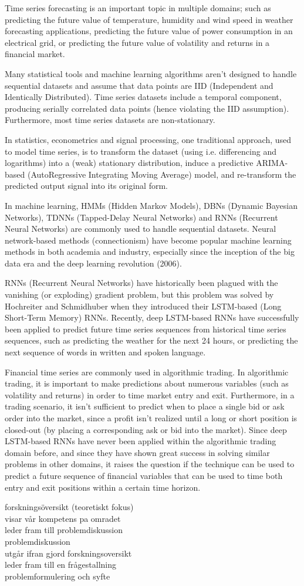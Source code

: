 
Time series forecasting is an important topic in multiple domains; such as predicting the future value of temperature, humidity and wind speed in weather forecasting applications, predicting the future value of power consumption in an electrical grid, or predicting the future value of volatility and returns in a financial market.

Many statistical tools and machine learning algorithms aren’t designed to handle sequential datasets and assume that data points are IID (Independent and Identically Distributed). Time series datasets include a temporal component, producing serially correlated data points (hence violating the IID assumption). Furthermore, most time series datasets are non-stationary.

In statistics, econometrics and signal processing, one traditional approach, used to model time series, is to transform the dataset (using i.e. differencing and logarithms) into a (weak) stationary distribution, induce a predictive ARIMA-based (AutoRegressive Integrating Moving Average) model, and re-transform the predicted output signal into its original form.

In machine learning, HMMs (Hidden Markov Models), DBNs (Dynamic Bayesian Networks), TDNNs (Tapped-Delay Neural Networks) and RNNs (Recurrent Neural Networks) are commonly used to handle sequential datasets. Neural network-based methods (connectionism) have become popular machine learning methods in both academia and industry, especially since the inception of the big data era and the deep learning revolution (2006).

RNNs (Recurrent Neural Networks) have historically been plagued with the vanishing (or exploding) gradient problem, but this problem was solved by Hochreiter and Schmidhuber when they introduced their LSTM-based (Long Short-Term Memory) RNNs. Recently, deep LSTM-based RNNs have successfully been applied to predict future time series sequences from historical time series sequences, such as predicting the weather for the next 24 hours, or predicting the next sequence of words in written and spoken language.

Financial time series are commonly used in algorithmic trading. In algorithmic trading, it is important to make predictions about numerous variables (such as volatility and returns) in order to time market entry and exit. Furthermore, in a trading scenario, it isn’t sufficient to predict when to place a single bid or ask order into the market, since a profit isn’t realized until a long or short position is closed-out (by placing a corresponding ask or bid into the market). Since deep LSTM-based RNNs have never been applied within the algorithmic trading domain before, and since they have shown great success in solving similar problems in other domains, it raises the question if the technique can be used to predict a future sequence of financial variables that can be used to time both entry and exit positions within a certain time horizon.

forskningsöversikt (teoretiskt fokus)\\
  visar vår kompetens pa omradet\\
  leder fram till problemdiskussion\\

problemdiskussion\\
  utgår ifran gjord forskningsoversikt\\
  leder fram till en frågestallning\\

problemformulering och syfte\\
